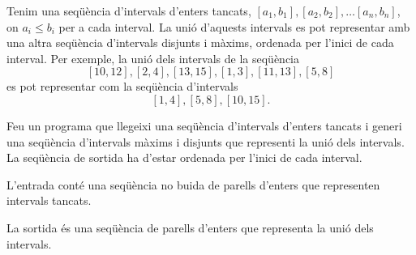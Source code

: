 

\Statement

Tenim una seqüència d'intervals d'enters tancats, $[a_1,b_1], [a_2, b_2], \ldots [a_n, b_n]$, on $a_i \leq b_i$ per a cada interval. La unió d'aquests intervals es pot representar amb una altra seqüència d'intervals disjunts i màxims, ordenada per l'inici de cada interval. Per exemple, la unió dels intervals de la seqüència
\[[10, 12], [2, 4], [13, 15], [1, 3], [11, 13], [5, 8]\]
es pot representar com la seqüència d'intervals
\[ [1,4], [5,8], [10,15].\]


\medskip

Feu un programa que llegeixi una seqüència d'intervals d'enters tancats i generi una seqüència d'intervals màxims i disjunts que representi la unió dels intervals. La seqüència de sortida ha d'estar ordenada per l'inici de cada interval.


\Input

L'entrada conté una seqüència no buida de parells d'enters que representen intervals tancats.


\Output

La sortida és una seqüència de parells d'enters que representa la unió dels intervals.

\Sample

